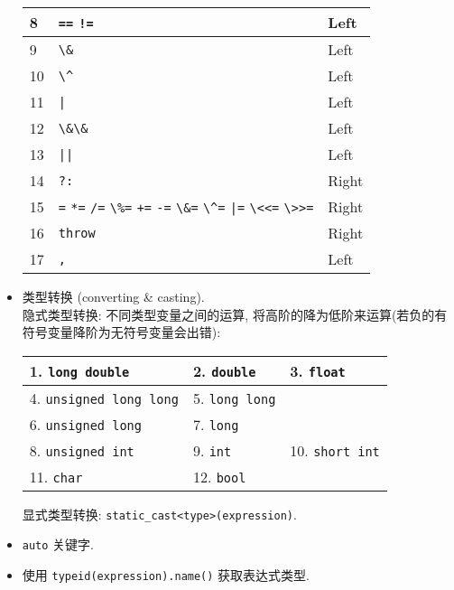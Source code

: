 \documentclass[a4paper,UTF8]{ctexart}
\begin{document}
\begin{itemize}[leftmargin=0pt, rightmargin=0cm, labelwidth=0.8cm, labelsep=0.2cm]
\begin{center}
\begin{tabularx}{\textwidth}{| X | l | X |}
   8 & \lstinline$==$ \quad \lstinline$!=$ & Left \\ \hline
   9 & \lstinline$\&$ & Left \\ \hline
   10 & \lstinline$\^$ & Left \\ \hline
   11 & \lstinline$|$ & Left \\ \hline
   12 & \lstinline$\&\&$ & Left \\ \hline
   13 & \lstinline$||$ & Left \\ \hline
   14 & \lstinline$?:$ & Right \\ \hline
   15 & \lstinline$=$ \quad \lstinline$*=$ \quad \lstinline$/=$ \quad
   \lstinline$\%=$ \quad \lstinline$+=$ \quad \lstinline$-=$ \quad
   \lstinline$\&=$ \quad \lstinline$\^=$ \quad \lstinline$|=$ \quad
   \lstinline$\<<=$ \quad \lstinline$\>>=$ & Right \\ \hline
   16 & \lstinline$throw$ & Right \\ \hline
   17 & \lstinline$,$ & Left \\ \hline
  \end{tabularx}
  \end{center}
  \vspace{-5pt}
\item 类型转换 (converting \& casting). \\
  隐式类型转换: 不同类型变量之间的运算, 将高阶的降为低阶来运算(若负的有符号变量降阶为无符号变量会出错):
  \vspace{-5pt}
  \begin{center}
  \begin{tabularx}{\textwidth}{| X | X | X |}
  \hline
   1. \lstinline$long double$ & 2. \lstinline$double$ & 3. \lstinline$float$
   \\ \hline
   4. \lstinline$unsigned long long$ & 5. \lstinline$long long$ & \\ \hline
   6. \lstinline$unsigned long$ & 7. \lstinline$long$ & \\ \hline
   8. \lstinline$unsigned int$ & 9. \lstinline$int$ & 10. \lstinline$short int$ \\ \hline
   11. \lstinline$char$ & 12. \lstinline$bool$ & \\ \hline
  \end{tabularx}
  \end{center}
  \vspace{-5pt}
  显式类型转换: \lstinline{static_cast<type>(expression)}.
\item \lstinline{auto} 关键字.
\item 使用 \lstinline{typeid(expression).name()} 获取表达式类型.
\end{itemize}
\end{document}
